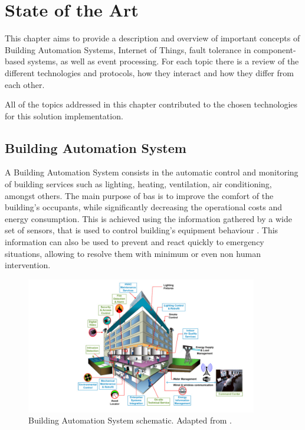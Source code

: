 \chapter{State of the Art}
\label{chapter:state_of_the_art}

This chapter aims to provide a description and overview of important concepts of Building Automation Systems, Internet of Things, fault tolerance in component-based systems, as well as event processing. For each topic there is a review of the different technologies and protocols, how they interact and how they differ from each other.

All of the topics addressed in this chapter contributed to the chosen technologies for this solution implementation.




\section{Building Automation System}

A Building Automation System consists in the automatic control and monitoring of building services such as lighting, heating, ventilation, air conditioning, amongst others. The main purpose of \ac{bas} is to improve the comfort of the building's occupants, while significantly decreasing the operational costs and energy consumption. This is achieved using the information gathered by a wide set of sensors, that is used to control building's equipment behaviour \cite{Brambley2005}. This information can also be used to prevent and react quickly to emergency situations, allowing to resolve them with minimum or even non human intervention.

\begin{figure}[H]
	\centering
	\includegraphics[width=0.9\textwidth]{figures/smart-building.jpg}
	\caption{Building Automation System schematic. Adapted from \cite{image-BAS}. }
	\label{fig:smart-building}
\end{figure}

